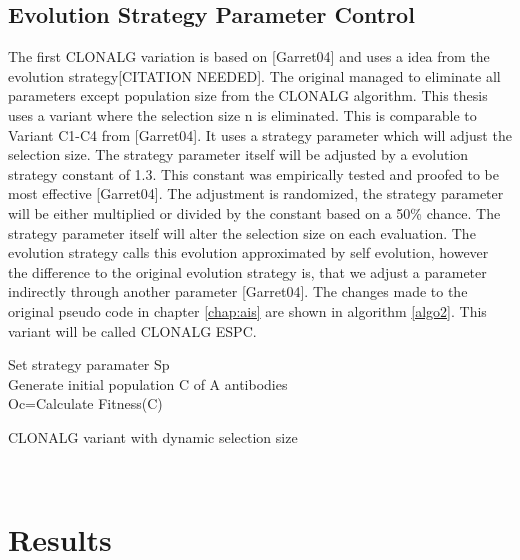 \subsection{Evolution Strategy Parameter Control}
The first CLONALG variation is based on [Garret04] and uses a idea from the evolution strategy[CITATION NEEDED]. The original managed to eliminate all parameters except population size from the CLONALG algorithm. This thesis uses a variant where the selection size n is eliminated. This is comparable to Variant C1-C4 from [Garret04]. It uses a strategy parameter which will adjust the selection size. The strategy parameter itself will be adjusted by a evolution strategy constant of 1.3. This constant was empirically tested and proofed to be most effective [Garret04]. The adjustment is randomized, the strategy parameter will be either multiplied or divided by the constant based on a 50\% chance. The strategy parameter itself will alter the selection size on each evaluation. The evolution strategy calls this evolution approximated by self evolution, however the difference to the original evolution strategy is, that we adjust a parameter indirectly through another parameter [Garret04]. The changes made to the original pseudo code in chapter \ref{chap:ais} are shown in algorithm \ref{algo2}. This variant will be called CLONALG ESPC.
\begin{algorithm}[H]
	Set strategy paramater Sp\\
	Generate initial population C of A antibodies\\
	Oc=Calculate Fitness(C)\\
	\caption{CLONALG variant with dynamic selection size}
	\label{algo2}
\end{algorithm}\\ 
\section{Results}
